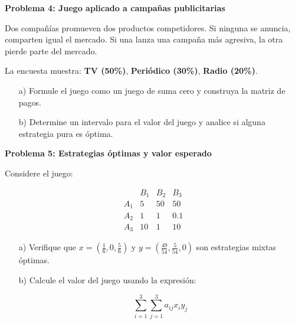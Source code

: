 \documentclass{article}
\begin{document}
\begin{problem} \textbf{Problema 4: Juego aplicado a campañas publicitarias}

Dos compañías promueven dos productos competidores. Si ninguna se anuncia, comparten igual el mercado. Si una lanza una campaña más agresiva, la otra pierde parte del mercado.

La encuesta muestra: \textbf{TV (50\%)}, \textbf{Periódico (30\%)}, \textbf{Radio (20\%)}.

\begin{itemize}
\item[a)] Formule el juego como un juego de suma cero y construya la matriz de pagos.
\item[b)] Determine un intervalo para el valor del juego y analice si alguna estrategia pura es óptima.
\end{itemize}

\end{problem}

\begin{problem} \textbf{Problema 5: Estrategias óptimas y valor esperado}

Considere el juego:

$$
\begin{array}{c|ccc}
      & B_1 & B_2 & B_3 \\
\hline
A_1 & 5 & 50 & 50 \\
A_2 & 1 & 1 & 0.1 \\
A_3 & 10 & 1 & 10
\end{array}
$$

\begin{itemize}
\item[a)] Verifique que $x=(\tfrac16, 0, \tfrac56)$ y $y=(\tfrac{49}{54}, \tfrac{5}{54}, 0)$ son estrategias mixtas óptimas.
\item[b)] Calcule el valor del juego usando la expresión:

$$
\sum_{i=1}^{3} \sum_{j=1}^{3} a_{ij}x_iy_j
$$
\end{itemize}

\end{problem}
\end{document}

